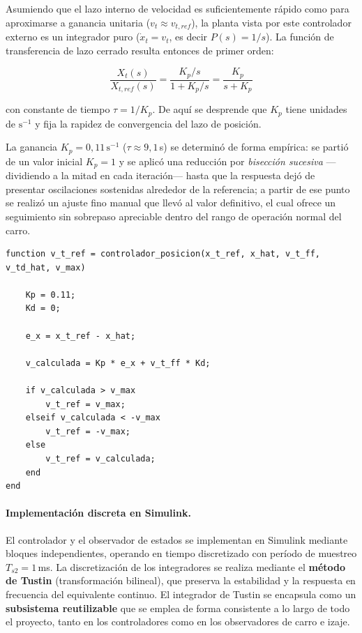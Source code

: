 \documentclass[12pt, a4paper]{article}
\begin{document}
Asumiendo que el lazo interno de velocidad es suficientemente rápido como para
aproximarse a ganancia unitaria ($v_t \approx v_{t,ref}$), la planta vista por este
controlador externo es un integrador puro ($\dot{x}_t = v_t$, es decir $P(s)=1/s$).
La función de transferencia de lazo cerrado resulta entonces de primer orden:

\begin{equation}
    \label{eq:ft-pos-ext}
    \frac{X_t(s)}{X_{t,ref}(s)} = \frac{K_p/s}{1 + K_p/s} = \frac{K_p}{s + K_p}
\end{equation}

con constante de tiempo $\tau = 1/K_p$. De aquí se desprende que $K_p$ tiene unidades
de $\text{s}^{-1}$ y fija la rapidez de convergencia del lazo de posición.

La ganancia $K_p = 0{,}11\,\text{s}^{-1}$ ($\tau \approx 9{,}1$\,s) se determinó de
forma empírica: se partió de un valor inicial $K_p = 1$ y se aplicó una reducción por
\textit{bisección sucesiva} —dividiendo a la mitad en cada iteración— hasta que la
respuesta dejó de presentar oscilaciones sostenidas alrededor de la referencia;
a partir de ese punto se realizó un ajuste fino manual que llevó al valor definitivo,
el cual ofrece un seguimiento sin sobrepaso apreciable dentro del rango de operación
normal del carro.

\begin{lstlisting}[style=matlab, caption={Lazo externo de posición del carro: generación de consigna de velocidad.}, label=lst:ctrl-pos-ext]
function v_t_ref = controlador_posicion(x_t_ref, x_hat, v_t_ff, v_td_hat, v_max)

    Kp = 0.11;
    Kd = 0;

    e_x = x_t_ref - x_hat;

    v_calculada = Kp * e_x + v_t_ff * Kd;

    if v_calculada > v_max
        v_t_ref = v_max;
    elseif v_calculada < -v_max
        v_t_ref = -v_max;
    else
        v_t_ref = v_calculada;
    end
end
\end{lstlisting}

\paragraph{Implementación discreta en Simulink.}

El controlador y el observador de estados se implementan en Simulink mediante bloques
independientes, operando en tiempo discretizado con período de muestreo $T_{s2} = 1$\,ms.
La discretización de los integradores se realiza mediante el \textbf{método de Tustin}
(transformación bilineal), que preserva la estabilidad y la respuesta en frecuencia del
equivalente continuo. El integrador de Tustin se encapsula como un \textbf{subsistema
reutilizable} que se emplea de forma consistente a lo largo de todo el proyecto, tanto en
los controladores como en los observadores de carro e izaje.
\end{document}
